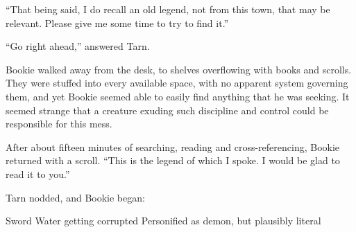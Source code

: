 ``That being said, I do recall an old legend, not from this town, that may be relevant.  Please give me some time to try to find it.''

``Go right ahead,'' answered Tarn.

Bookie walked away from the desk, to shelves overflowing with books and scrolls.  They were stuffed into every available space, with no apparent system governing them, and yet Bookie seemed able to easily find anything that he was seeking.  It seemed strange that a creature exuding such discipline and control could be responsible for this mess.

After about fifteen minutes of searching, reading and cross-referencing, Bookie returned with a scroll.  ``This is the legend of which I spoke.  I would be glad to read it to you.''

Tarn nodded, and Bookie began:

Sword
Water getting corrupted
Personified as demon, but plausibly literal